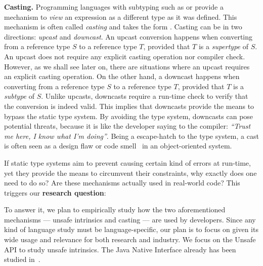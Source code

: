 \textbf{Casting.}
Programming languages with subtyping such as \java{} or \cpp{} provide a mechanism to \emph{view} an expression as a different type as it was defined.
This mechanism is often called \emph{casting} and takes the form .
Casting can be in two directions: \emph{upcast} and \emph{downcast}.
An upcast conversion happens when converting from a reference type $S$ to a reference type $T$, provided that $T$ is a \emph{supertype} of $S$.
An upcast does not require any explicit casting operation nor compiler check.
However, as we shall see later on, there are situations where an upcast requires an explicit casting operation.
On the other hand, a downcast happens when converting from a reference type $S$ to a reference type $T$, provided that $T$ is a \emph{subtype} of $S$.
Unlike upcasts, downcasts require a run-time check to verify that the conversion is indeed valid.
This implies that downcasts provide the means to bypass the static type system.
By avoiding the type system, downcasts can pose potential threats, because it is like the developer saying to the compiler: \emph{``Trust me here, I know what I'm doing''}.
Being a escape-hatch to the type system, a cast is often seen as a design flaw or code smell~\cite{tufanoWhenWhyYour2015} in an object-oriented system.

If static type systems aim to prevent causing certain kind of errors at run-time,
yet they provide the means to circumvent their constraints,
why exactly does one need to do so?
Are these mechanisms actually used in real-world code?
This triggers our \textbf{research question}:


To answer it,
we plan to empirically study how the two aforementioned mechanisms
--- unsafe intrinsics and casting ---
are used by developers.
Since any kind of language study must be language-specific,
our plan is to focus on \java{} given its wide usage and relevance for both research and industry.
We focus on the \java{} Unsafe API to study unsafe intrinsics.
The Java Native Interface already has been studied in~\cite{tanSafeJavaNative2006,tanEmpiricalSecurityStudy2008,kondohFindingBugsJava2008a,sunNativeGuardProtectingAndroid2014,liFindingBugsExceptional2009}.

